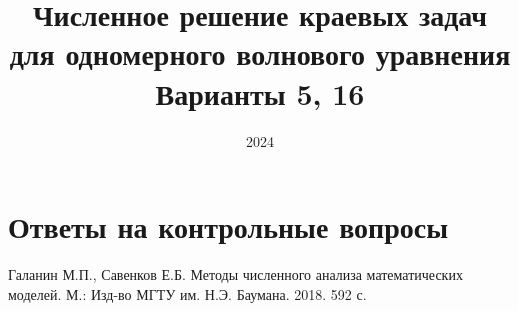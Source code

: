 \documentclass[12pt, a4paper]{article}
\title{Численное решение краевых задач
	для одномерного волнового уравнения \\ Варианты 5, 16}
\date{2024}
\begin{document}
	\maketitle
	\section{Ответы на контрольные вопросы}
	

	
	
	
	
	
	\clearpage
	\begin{thebibliography}{1}
		 Галанин М.П., Савенков Е.Б. Методы численного анализа математических моделей. М.: Изд-во МГТУ им. Н.Э. Баумана. 2018. 592 с.
		
	\end{thebibliography}
	
\end{document}
